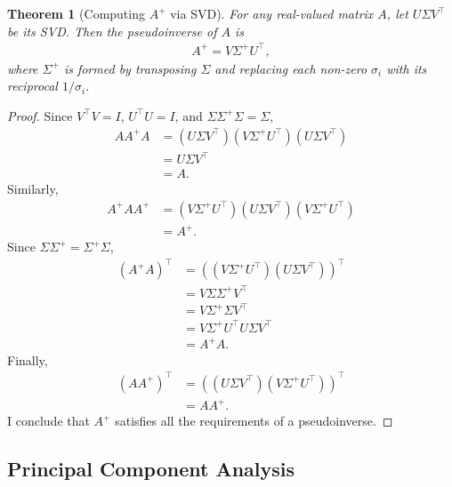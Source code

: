 \documentclass[]{article}
\theoremstyle{plain}
\newtheorem{thm}{Theorem}
\theoremstyle{definition}
\theoremstyle{remark}
\begin{document}
\begin{thm}[Computing $A^+$ via SVD]
For any real-valued matrix $A$, let $U\Sigma V^\top$ be its SVD. Then the
pseudoinverse of $A$ is
\begin{align*}
A^+ = V\Sigma^+U^\top,
\end{align*}
where $\Sigma^+$ is formed by transposing $\Sigma$ and replacing each non-zero
$\sigma_i$ with its reciprocal $1/\sigma_i$.
\end{thm}
\begin{proof}
Since $V^\top V = I$, $U^\top U = I$, and $\Sigma \Sigma^+ \Sigma = \Sigma$,
\begin{align*}
AA^+A &=  (U\Sigma V^\top) (V\Sigma^+U^\top) (U\Sigma V^\top) \\
 &= U\Sigma V^\top \\
 &= A.
\end{align*}
Similarly,
\begin{align*}
A^+AA^+ &= (V\Sigma^+U^\top) (U\Sigma V^\top)(V\Sigma^+U^\top) \\
  &= A^+.
\end{align*}
Since $\Sigma \Sigma^+ = \Sigma^+ \Sigma$,
\begin{align*}
(A^+A)^\top &= ( (V\Sigma^+U^\top) (U\Sigma V^\top) )^\top \\
  &= V\Sigma \Sigma^+ V^\top \\
  &= V\Sigma^+ \Sigma V^\top \\
  &= V\Sigma^+U^\top U\Sigma V^\top \\
  &= A^+A.
\end{align*}
Finally,
\begin{align*}
(AA^+)^\top &= ((U\Sigma V^\top) (V\Sigma^+U^\top) )^\top\\
 &= AA^+.
\end{align*}
I conclude that $A^+$ satisfies all the requirements of a pseudoinverse.
\end{proof}

\subsection{Principal Component Analysis}\label{pca}
\end{document}
